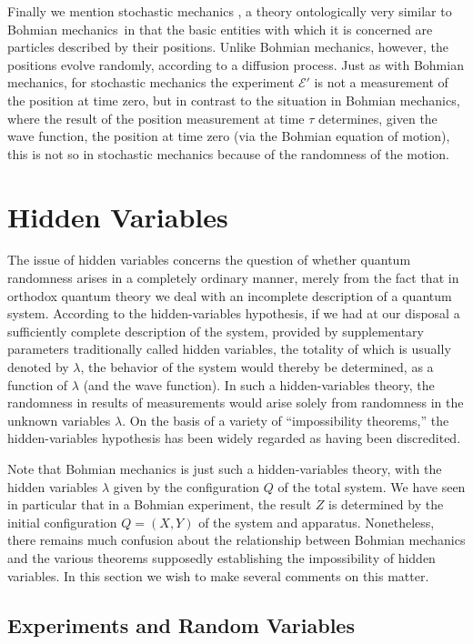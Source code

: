 \documentclass[12pt]{article}
\newcommand{\BM}{Bohmian mechanics}
\newcommand{\wf}{wave function}
\newcommand{\E}{\mbox{$\mathscr{E}$}}
\begin{document}
Finally we mention stochastic mechanics \cite{Nel85}, a theory
ontologically very similar to \BM\, in that the basic entities with
which it is concerned are particles described by their positions.
Unlike \BM{}, however, the positions evolve randomly, according to a
diffusion process. Just as with \BM{}, for stochastic mechanics the
experiment $\E'$ is not a measurement of the position at time zero,
but in contrast to the situation in \BM{}, where the result of the
position measurement at time $\tau$ determines, given the \wf{}, the
position at time zero (via the Bohmian equation of motion), this is
not so in stochastic mechanics because of the randomness of the
motion.



\section{Hidden Variables}\label{secHV}

The issue of hidden variables concerns the question of whether quantum
randomness arises in a completely ordinary manner, merely {}from the
fact that in orthodox quantum theory we deal with an incomplete
description of a quantum system. According to the hidden-variables
hypothesis, if we had at our disposal a sufficiently complete
description of the system, provided by supplementary parameters
traditionally called hidden variables, the totality of which is
usually denoted by $\lambda$, the behavior of the system would thereby
be determined, as a function of $\lambda$ (and the wave function).  In
such a hidden-variables theory, the randomness in results of
measurements would arise solely {}from randomness in the unknown
variables $\lambda$. On the basis of a variety of ``impossibility
theorems,'' the hidden-variables hypothesis has been widely regarded
as having been discredited.

Note that Bohmian mechanics is just such a hidden-variables theory,
with the hidden variables $\lambda$ given by the configuration $Q$ of
the total system. We have seen in particular that in a Bohmian
experiment, the result $Z$ is determined by the initial configuration
$Q=(X,Y)$ of the system and apparatus.  Nonetheless, there remains
much confusion about the relationship between Bohmian mechanics and
the various theorems supposedly establishing the impossibility of
hidden variables.  In this section we wish to make several comments on
this matter.

\subsection{Experiments and Random Variables}\label{seerv}
\end{document}
